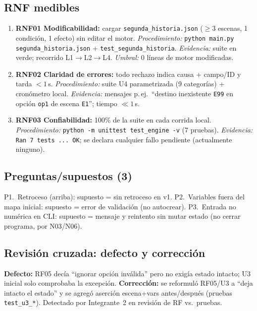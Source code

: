 \documentclass[11pt,a4paper]{article}
\begin{document}
\subsection{RNF medibles}
\begin{enumerate}
\item \textbf{RNF01 Modificabilidad:} cargar \texttt{segunda\_historia.json} ($\geq$3 escenas, 1 condici\'on, 1 efecto) sin editar el motor. \textit{Procedimiento:} \texttt{python main.py segunda\_historia.json} + \texttt{test\_segunda\_historia}. \textit{Evidencia:} suite en verde; recorrido L1$\to$L2$\to$L4. \textit{Umbral:} 0 l\'ineas de motor modificadas.
\item \textbf{RNF02 Claridad de errores:} todo rechazo indica causa + campo/ID y tarda $<1$\,s. \textit{Procedimiento:} suite U4 parametrizada (9 categor\'ias) + cron\'ometro local. \textit{Evidencia:} mensajes p.\,ej.\ ``destino inexistente \texttt{E99} en opci\'on \texttt{op1} de escena \texttt{E1}''; tiempo $\ll1$\,s.
\item \textbf{RNF03 Confiabilidad:} 100\% de la suite en cada corrida local. \textit{Procedimiento:} \texttt{python -m unittest test\_engine -v} (7 pruebas). \textit{Evidencia:} \texttt{Ran 7 tests ... OK}; se declara cualquier fallo pendiente (actualmente ninguno).
\end{enumerate}

\subsection{Preguntas/supuestos (3)}
P1.\ Retroceso (arriba): supuesto = sin retroceso en v1. P2.\ Variables fuera del mapa inicial: supuesto = error de validaci\'on (no autocrear). P3.\ Entrada no num\'erica en CLI: supuesto = mensaje y reintento sin mutar estado (no cerrar programa, por N03/N06).

\label{sec:defecto}
\subsection{Revisi\'on cruzada: defecto y correcci\'on}
\textbf{Defecto:} RF05 dec\'ia ``ignorar opci\'on inv\'alida'' pero no exig\'ia estado intacto; U3 inicial solo comprobaba la excepci\'on. \textbf{Correcci\'on:} se reformul\'o RF05/U3 a ``deja intacto el estado'' y se agreg\'o aserci\'on escena+vars antes/despu\'es (pruebas \texttt{test\_u3\_*}). Detectado por Integrante~2 en revisi\'on de RF vs.\ pruebas.

\end{document}
